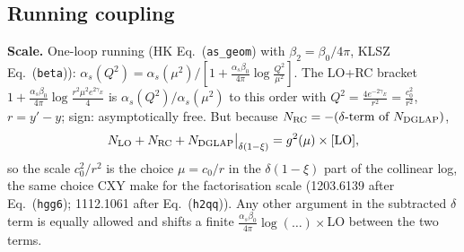 \subsection{Running coupling}

\noindent\textbf{Scale.} One-loop running (HK Eq.~(\texttt{as\_geom}) with $\beta_{2}=\beta_{0}/4\pi$, KLSZ Eq.~(\texttt{beta})): $\alpha_{s}(Q^{2})=\alpha_{s}(\mu^{2})/[1+\frac{\alpha_{s}\beta_{0}}{4\pi}\log\frac{Q^{2}}{\mu^{2}}]$. The LO+RC bracket $1+\frac{\alpha_{s}\beta_{0}}{4\pi}\log\frac{r^{2}\mu^{2}e^{2\gamma_{E}}}{4}$ is $\alpha_{s}(Q^{2})/\alpha_{s}(\mu^{2})$ to this order with $Q^{2}=\frac{4e^{-2\gamma_{E}}}{r^{2}}=\frac{c_{0}^{2}}{r^{2}}$, $r=y'-y$; sign: asymptotically free. But because $N_{\rm RC}=-(\delta\text{-term of }N_{\rm DGLAP})$,
\begin{equation}
N_{\rm LO}+N_{\rm RC}+N_{\rm DGLAP}\big|_{\delta(1-\xi)}=g^{2}(\mu)\times[\text{LO}],
\end{equation}
so the scale $c_{0}^{2}/r^{2}$ is the choice $\mu=c_{0}/r$ in the $\delta(1-\xi)$ part of the collinear log, the same choice CXY make for the factorisation scale (1203.6139 after Eq.~(\texttt{hgg6}); 1112.1061 after Eq.~(\texttt{h2qq})). Any other argument in the subtracted $\delta$ term is equally allowed and shifts a finite $\frac{\alpha_{s}\beta_{0}}{4\pi}\log(\dots)\times$LO between the two terms.

